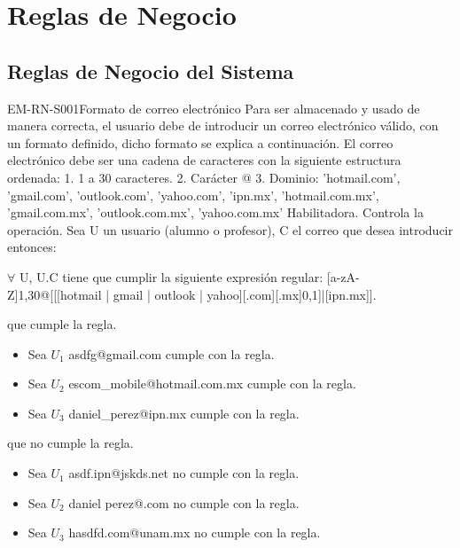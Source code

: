 \section{Reglas de Negocio}

\subsection{Reglas de Negocio del Sistema}

\begin{BussinesRule}{EM-RN-S001}{Formato de correo electrónico}
	\BRitem[Descripción:] Para ser almacenado y usado de manera correcta, el usuario debe de introducir un correo electrónico válido, con un formato definido, dicho formato se explica a continuación. El correo electrónico debe ser una cadena de caracteres con la siguiente estructura ordenada:
	1. 1 a 30 caracteres.
	2. Carácter @
	3. Dominio: 'hotmail.com', 'gmail.com', 'outlook.com', 'yahoo.com', 'ipn.mx', 'hotmail.com.mx', 'gmail.com.mx', 'outlook.com.mx', 'yahoo.com.mx'
	\BRitem[Tipo:] Habilitadora.
	\BRitem[Nivel:] Controla la operación.
	\BRitem[Sentencia:] Sea U un usuario (alumno o profesor), C el correo que desea introducir entonces: 
		\begin{center}
			$\forall$ U, U.C tiene que cumplir la siguiente expresión regular: [a-zA-Z]{1,30}@[[[hotmail | gmail | outlook | yahoo][.com][.mx]{0,1}]|[ipn.mx]].
		\end{center}
	 que cumple la regla.
		\begin{itemize}
			\item Sea $U_{1}$ asdfg@gmail.com  cumple con la regla.
			\item Sea $U_{2}$ escom\_mobile@hotmail.com.mx cumple con la regla.
			\item Sea $U_{3}$ daniel\_perez@ipn.mx cumple con la regla.
		\end{itemize}
	 que no cumple la regla.
		\begin{itemize}
			\item Sea $U_{1}$ asdf.ipn@jskds.net no cumple con la regla.
			\item Sea $U_{2}$ daniel perez@.com no cumple con la regla.
			\item Sea $U_{3}$ hasdfd.com@unam.mx no cumple con la regla.
		\end{itemize}
\end{BussinesRule}


